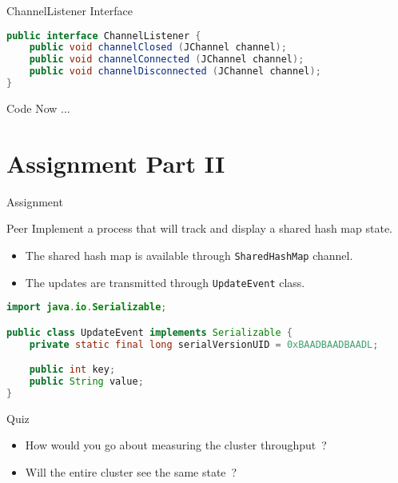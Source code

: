 \begin{frame}[fragile]{ChannelListener Interface}
\begin{lstlisting}[language=java,style=mini]
public interface ChannelListener {
    public void channelClosed (JChannel channel);
    public void channelConnected (JChannel channel);
    public void channelDisconnected (JChannel channel);
}
\end{lstlisting}
\end{frame}


\begin{frame}{Code Now ...}
\end{frame}


\section{Assignment Part II}


\begin{frame}[fragile]{Assignment}
    \begin{block}{Peer}
        Implement a process that will track and display a shared hash map state.
        \begin{itemize}
            \item The shared hash map is available through \lstinline{SharedHashMap} channel.
            \item The updates are transmitted through \lstinline{UpdateEvent} class.
        \end{itemize}
    \end{block}

\begin{lstlisting}[language=java,style=mini]
import java.io.Serializable;

public class UpdateEvent implements Serializable {
    private static final long serialVersionUID = 0xBAADBAADBAADL;

    public int key;
    public String value;
}
\end{lstlisting}

    \begin{block}{Quiz}
        \begin{itemize}
            \item How would you go about measuring the cluster throughput~?
            \item Will the entire cluster see the same state~?
        \end{itemize}
    \end{block}
\end{frame}


